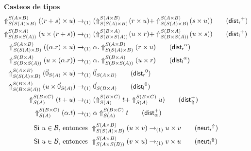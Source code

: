 \textbf{Casteos de tipos}
\begin{align*}
	\cast{S(S(A) \times B)}{S(A \times B)} ((r + s) \times u)      & \reducesto_{(1)} (\cast{S(S(A) \times B)}{S(A \times B)}\!(r \times u) + \cast{S(S(A) \times B)}{S(A \times B)}\!(s \times u)) \tag{\( \mathsf{dist_r}^+ \)} \\
	\cast{S(B \times S(A))}{S(B \times A)} (u \times (r + s))      & \reducesto_{(1)} (\cast{S(B \times S(A))}{S(B \times A)}\!(u \times r) + \cast{S(B \times S(A))}{S(B \times A)}\!(u \times s)) \tag{\( \mathsf{dist_l}^+ \)} \\
	\cast{S(S(A) \times B)}{S(A \times B)} ((\alpha . r) \times u) & \reducesto_{(1)} \alpha . \cast{S(S(A) \times B)}{S(A \times B)} (r \times u) \tag{\( \mathsf{dist_r}^\alpha \)}                                             \\
	\cast{S(B \times S(A))}{S(B \times A)} (u \times (\alpha . r)) & \reducesto_{(1)} \alpha . \cast{S(B \times S(A))}{S(B \times A)} (u \times r) \tag{\( \mathsf{dist_l}^\alpha \)}                                             \\
	\cast{S(S(A) \times B)}{S(A \times B)} (\nullvec{A} \times u)  & \reducesto_{(1)} \nullvec{A \times B} \tag{\( \mathsf{dist_r}^0 \)}                                                                                          \\
	\cast{S(B \times S(A))}{S(B \times A)} (u \times \nullvec{A})  & \reducesto_{(1)} \nullvec{B \times A} \tag{\( \mathsf{dist_l}^0 \)}                                                                                          \\
	\cast{S(A)}{S(B \times C)} (t + u)                             & \reducesto_{(1)} (\cast{S(A)}{S(B \times C)} t + \cast{S(A)}{S(B \times C)} u) \tag{\( \mathsf{dist}_\Uparrow^+ \)}                                          \\
	\cast{S(A)}{S(B \times C)} (\alpha . t)                        & \reducesto_{(1)} \alpha \cast{S(A)}{S(B \times C)} t \tag{\( \mathsf{dist}_\alpha^+ \)}
\end{align*}
\begin{align*}
	\text{Si } u \in \mathcal{B} \text{, entonces } \cast{S(S(A) \times B)}{S(A \times B)} (u \times v) & \reducesto_{(1)} u \times v \tag{\( \mathsf{neut_r}^\Uparrow \)} \\
	\text{Si } u \in \mathcal{B} \text{, entonces } \cast{S(A \times S(B))}{S(A \times B)} (v \times u) & \reducesto_{(1)} v \times u \tag{\( \mathsf{neut_l}^\Uparrow \)}
\end{align*}

